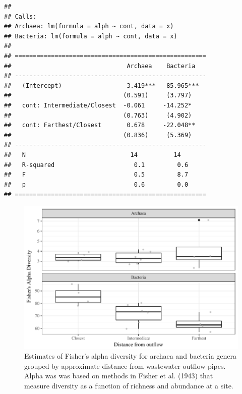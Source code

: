\documentclass[letterpaper,12pt]{article}\usepackage[]{graphicx}\usepackage[]{color}
\makeatletter
\def\maxwidth{ %
  \ifdim\Gin@nat@width>\linewidth
    \linewidth
  \else
    \Gin@nat@width
  \fi
}
\newenvironment{kframe}{%
 \def\at@end@of@kframe{}%
 \ifinner\ifhmode%
  \def\at@end@of@kframe{\end{minipage}}%
  \begin{minipage}{\columnwidth}%
 \fi\fi%
 \def\FrameCommand##1{\hskip\@totalleftmargin \hskip-\fboxsep
 \colorbox{shadecolor}{##1}\hskip-\fboxsep
     \hskip-\linewidth \hskip-\@totalleftmargin \hskip\columnwidth}%
 \MakeFramed {\advance\hsize-\width
   \@totalleftmargin\z@ \linewidth\hsize
   \@setminipage}}%
 {\par\unskip\endMakeFramed%
 \at@end@of@kframe}
\newenvironment{knitrout}{}{} %
\makeatother
\begin{document}
\clearpage
\begin{knitrout}
\color{fgcolor}\begin{kframe}
\begin{verbatim}
## 
## Calls:
## Archaea: lm(formula = alph ~ cont, data = x)
## Bacteria: lm(formula = alph ~ cont, data = x)
## 
## =====================================================
##                                Archaea    Bacteria   
## -----------------------------------------------------
##   (Intercept)                  3.419***   85.965***  
##                               (0.591)     (3.797)    
##   cont: Intermediate/Closest  -0.061     -14.252*    
##                               (0.763)     (4.902)    
##   cont: Farthest/Closest       0.678     -22.048**   
##                               (0.836)     (5.369)    
## -----------------------------------------------------
##   N                             14          14       
##   R-squared                      0.1         0.6     
##   F                              0.5         8.7     
##   p                              0.6         0.0     
## =====================================================
\end{verbatim}
\end{kframe}\begin{figure}[!ht]

{\centering \includegraphics[width=\maxwidth]{figs/boxdivcont} 

}

\caption[Estimates of Fisher's alpha diversity for archaea and bacteria genera grouped by approximate distance from wastewater outflow pipes]{Estimates of Fisher's alpha diversity for archaea and bacteria genera grouped by approximate distance from wastewater outflow pipes. Alpha was was based on methods in Fisher et al. (1943) that measure diversity as a function of richness and abundance at a site.}\label{fig:boxdivcont}
\end{figure}


\end{knitrout}
\end{document}
